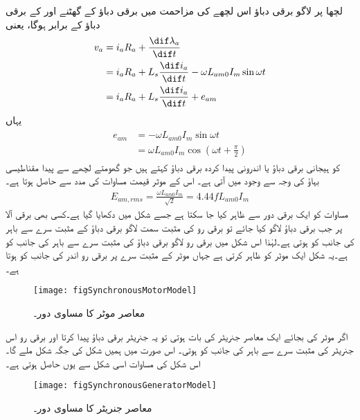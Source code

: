 لچھا  پر لاگو برقی دباؤ اس لچھے کی مزاحمت  میں برقی دباؤ کے گھٹنے اور  کے برقی دباؤ کے برابر ہوگا، یعنی
\begin{gather}
\begin{aligned}
v_a&=i_a R_a+\frac{\dif \lambda_a}{\dif t}\\
&=i_a R_a+L_s \frac{\dif i_a}{\dif t}-\omega L_{am0} I_m \sin \omega t\\
&=i_a R_a+L_s \frac{\dif i_a}{\dif t}+e_{am}
\end{aligned}
\end{gather}
یہاں
\begin{gather}
\begin{aligned}
e_{am}&=-\omega L_{am0} I_m \sin \omega t\\
&=\omega L_{am0} I_m \cos \left (\omega t+\frac{\pi}{2} \right)
\end{aligned}
\end{gather}
کو ہیجانی برقی دباؤ یا اندرونی پیدا کردہ برقی دباؤ کہتے ہیں جو گھومتے لچھے سے پیدا مقناطیسی بہاؤ کی وجہ سے وجود میں آتی ہے۔  اس کے موثر قیمت  مساوات  کی مدد سے حاصل ہوتا ہے۔
\begin{align}
E_{am,rms}=\frac{\omega L_{am0} I_m}{\sqrt{2}}=4.44 f L_{am0} I_m
\end{align}
مساوات  کو ایک برقی دور سے ظاہر کیا جا سکتا ہے جسے شکل   میں دکھایا گیا ہے۔کسی بھی برقی آلا پر جب برقی دباؤ لاگو کیا جائے تو برقی رو کی مثبت سمت لاگو برقی دباؤ کے مثبت سرے سے باہر کی جانب کو ہوتی ہے۔لہٰذا اس شکل میں برقی رو  لاگو برقی دباؤ  کی مثبت سرے سے باہر کی جانب کو ہے۔یہ شکل ایک موٹر کو ظاہر کرتی ہے جہاں موٹر کے مثبت سرے پر برقی رو اندر کی جانب کو ہوتا ہے۔
\begin{figure}
\centering
\texttt{[image: figSynchronousMotorModel]}
\caption{معاصر موٹر کا مساوی دور۔}
\label{شکل_معاصر_موٹر_کا_مساوی_دور}
\end{figure}
اگر موٹر کی بجائے ایک معاصر جنریٹر کی بات ہوتی تو یہ جنریٹر برقی دباؤ پیدا کرتا اور برقی رو اس جنریٹر کی مثبت سرے سے باہر کی جانب کو ہوتی۔ اس صورت میں ہمیں شکل   کی جگہ شکل   ملے گا۔اس شکل کی مساوات اسی شکل سے یوں حاصل ہوتی ہے۔
\begin{figure}
\centering
\texttt{[image: figSynchronousGeneratorModel]}
\caption{معاصر جنریٹر کا مساوی دور۔}
\label{شکل_معاصر_جنریٹر_کا_مساوی_دور}
\end{figure}

